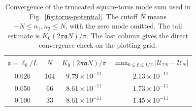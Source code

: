 \documentclass[nopacs,amsmath,amsfonts,amssymb,aps,superscriptaddress]{revtex4}
\begin{document}
\begin{table}[t]
\caption{Convergence of the truncated square-torus mode sum used in Fig.~\ref{fig:torus-potential}. The cutoff \(N\) means \(-N\leq n_1,n_2\leq N\), with the zero mode omitted. The tail estimate is \(K_0(2\pi\mathfrak a N)/\pi\). The last column gives the direct convergence check on the plotting grid.}
\label{tab:torus-convergence}
\begin{ruledtabular}
\begin{tabular}{cccc}
\(\mathfrak a=\ell_0/L\) &
\(N\) &
\(K_0(2\pi\mathfrak a N)/\pi\) &
\(\displaystyle{\max_{0\leq\xi\leq 1/2}} |\mathcal U_{2N}-\mathcal U_N|\) \\
\hline
\(0.020\) & \(164\) & \(9.79\times10^{-11}\) & \(2.13\times10^{-11}\) \\
\(0.050\) & \(66\)  & \(8.61\times10^{-11}\) & \(1.73\times10^{-11}\) \\
\(0.100\) & \(33\)  & \(8.61\times10^{-11}\) & \(1.45\times10^{-11}\) \\
\end{tabular}
\end{ruledtabular}
\end{table}
\end{document}
